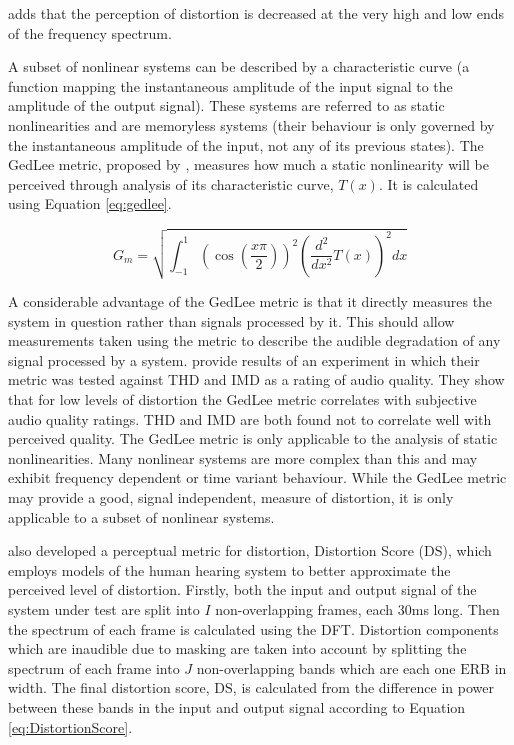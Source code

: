 			\citet{voishvillo2006assessment} adds that the perception of distortion is decreased at the very
			high and low ends of the frequency spectrum.

			A subset of nonlinear systems can be described by a characteristic curve (a function mapping the
			instantaneous amplitude of the input signal to the amplitude of the output signal). These systems
			are referred to as static nonlinearities and are memoryless systems (their behaviour is only
			governed by the instantaneous amplitude of the input, not any of its previous states). The GedLee
			metric, proposed by \citet{geddes2003auditory}, measures how much a static nonlinearity will be
			perceived through analysis of its characteristic curve, $T(x)$. It is calculated using Equation
			\ref{eq:gedlee}.

			\begin{equation}
				G_{m} = \sqrt{\int_{-1}^{1} \left( \cos \left( \frac{x\pi}{2} \right) \right)^{2}
					      \left( \frac{d^{2}}{dx^{2}} T(x) \right)^{2} dx}
				\label{eq:gedlee}
			\end{equation}

			A considerable advantage of the GedLee metric is that it directly measures the system in question
			rather than signals processed by it. This should allow measurements taken using the metric to
			describe the audible degradation of any signal processed by a system. \citet{lee2003auditory}
			provide results of an experiment in which their metric was tested against THD and IMD as a rating
			of audio quality. They show that for low levels of distortion the GedLee metric correlates with
			subjective audio quality ratings. THD and IMD are both found not to correlate well with perceived
			quality. The GedLee metric is only applicable to the analysis of static nonlinearities. Many
			nonlinear systems are more complex than this and may exhibit frequency dependent or time variant
			behaviour. While the GedLee metric may provide a good, signal independent, measure of distortion,
			it is only applicable to a subset of nonlinear systems.

			\citet{tan2003the} also developed a perceptual metric for distortion, Distortion Score
			($\mathrm{DS}$), which employs models of the human hearing system to better approximate the
			perceived level of distortion. Firstly, both the input and output signal of the system under test
			are split into $I$ non-overlapping frames, each 30ms long. Then the spectrum of each frame is
			calculated using the DFT. Distortion components which are inaudible due to masking are taken into
			account by splitting the spectrum of each frame into $J$ non-overlapping bands which are each one
			$\mathrm{ERB}$ in width. The final distortion score, $\mathrm{DS}$, is calculated from the
			difference in power between these bands in the input and output signal according to Equation
			\ref{eq:DistortionScore}.

